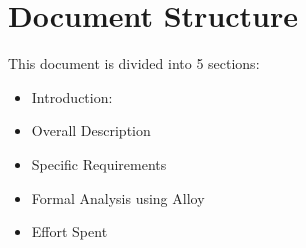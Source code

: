 \section{Document Structure}
This document is divided into 5 sections:
\begin{itemize}
\item Introduction:

\item Overall Description

\item Specific Requirements

\item Formal Analysis using Alloy

\item Effort Spent



\end{itemize}